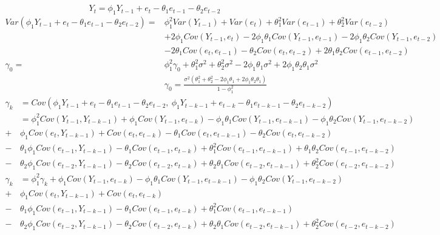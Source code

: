 \documentclass{article}
\begin{document}
\section{}
\[ Y_t = \phi_1 Y_{t-1} + e_t - \theta_1 e_{t-1} - \theta_2 e_{t-2}  \]
\begin{align*}
   Var\left( \phi_1 Y_{t-1} + e_t - \theta_1 e_{t-1} - \theta_2 e_{t-2} \right) 
   = & \phi_1^2 Var(Y_{t-1})  + Var(e_t) + \theta_1^2 Var(e_{t-1}) + \theta_2^2 Var(e_{t-2}) \\
   & + 2\phi_1 Cov(Y_{t-1}, e_t) -2 \phi_1\theta_1 Cov(Y_{t-1}, e_{t-1}) - 2\phi_1\theta_2 Cov(Y_{t-1}, e_{t-2}) \\
   & - 2\theta_1Cov(e_t,e_{t-1}) - \theta_2 Cov(e_t, e_{t-2}) + 2\theta_1\theta_2 Cov(e_{t-1}, e_{t-2}) \\
  \gamma_0 = & \phi_1^2 \gamma_0 + \theta_1^2 \sigma^2  + \theta_2^2 \sigma^2 -2 \phi_1\theta_1 \sigma^2 + 2\phi_1\theta_2 \theta_1 \sigma^2 \\
  & \gamma_0 = \frac{\sigma^2\left(\theta_1^2 + \theta_2^2 -2 \phi_1\theta_1 + 2\phi_1\theta_2 \theta_1\right)}{1-\phi_1^2}
\end{align*}
\begin{align*}
   \gamma_k & = Cov(\phi_1 Y_{t-1} + e_t - \theta_1 e_{t-1} - \theta_2 e_{t-2} , \ \phi_1 Y_{t-k-1} + e_{t-k} - \theta_1 e_{t-k-1} - \theta_2 e_{t-k-2}) \\
   &  = \phi_1^2 Cov(Y_{t-1}, Y_{t-k-1}) + \phi_1 Cov(Y_{t-1} , e_{t-k}) - \phi_1\theta_1 Cov(Y_{t-1} ,e_{t-k-1}) -\phi_1 \theta_2 Cov(Y_{t-1}, e_{t-k-2}) \\
   + & \phi_1 Cov(e_t,Y_{t-k-1}) + Cov(e_t, e_{t-k}) - \theta_1 Cov(e_t, e_{t-k-1}) - \theta_2 Cov( e_t, e_{t-k-2}) \\
   - & \theta_1 \phi_1 Cov( e_{t-1} , Y_{t-k-1}) - \theta_1 Cov(e_{t-1} , e_{t-k})  + \theta_1^2 Cov(e_{t-1} , e_{t-k-1}) + \theta_1\theta_2 Cov(e_{t-1},  e_{t-k-2}) \\
   - & \theta_2\phi_1 Cov(e_{t-2}, Y_{t-k-1}) - \theta_2 Cov(e_{t-2}, e_{t-k}) + \theta_2\theta_1 Cov(e_{t-2}, e_{t-k-1}) + \theta_2^2 Cov(e_{t-2}, e_{t-k-2})
\end{align*}
\begin{align*}
   \gamma_k &  = \phi_1^2 \gamma_k + \phi_1 Cov(Y_{t-1} , e_{t-k}) - \phi_1\theta_1 Cov(Y_{t-1} ,e_{t-k-1}) -\phi_1 \theta_2 Cov(Y_{t-1}, e_{t-k-2}) \\
   + & \phi_1 Cov(e_t,Y_{t-k-1}) + Cov(e_t, e_{t-k})  \\
   - & \theta_1 \phi_1 Cov( e_{t-1} , Y_{t-k-1}) - \theta_1 Cov(e_{t-1} , e_{t-k})  + \theta_1^2 Cov(e_{t-1} , e_{t-k-1})  \\
   - & \theta_2\phi_1 Cov(e_{t-2}, Y_{t-k-1}) - \theta_2 Cov(e_{t-2}, e_{t-k}) + \theta_2\theta_1 Cov(e_{t-2}, e_{t-k-1}) + \theta_2^2 Cov(e_{t-2}, e_{t-k-2})
\end{align*}
\end{document}
